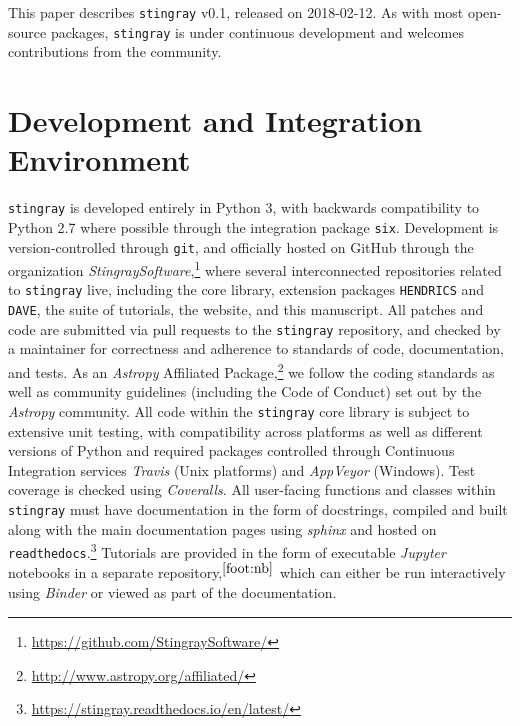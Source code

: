 \documentclass[twocolumn]{aastex62}
\newcommand{\stingray}{\texttt{stingray}\xspace}
\newcommand{\hendrics}{\texttt{HENDRICS}\xspace}
\begin{document}
This paper describes \stingray v0.1, released on 2018-02-12. 
As with most open-source packages, \stingray is under continuous development and welcomes contributions from the community.


\section{Development and Integration Environment}
\label{sec:development}

\stingray is developed entirely in Python 3, with backwards compatibility to Python 2.7 where possible through the integration package \texttt{six}. 
Development is version-controlled through \texttt{git}, and officially hosted on GitHub through the organization \textit{StingraySoftware},\footnote{\url{https://github.com/StingraySoftware/}} where several interconnected repositories related to \stingray live, including the core library, extension packages \hendrics and \texttt{DAVE}, the suite of tutorials, the website, and this manuscript. 
All patches and code are submitted via pull requests to the \stingray repository, and checked by a maintainer for correctness and adherence to standards of code, documentation, and tests. 
As an \textit{Astropy} Affiliated Package,\footnote{\url{http://www.astropy.org/affiliated/}} we follow the coding standards as well as community guidelines (including the Code of Conduct) set out by the \textit{Astropy} community. 
All code within the \stingray core library is subject to extensive unit testing, with compatibility across platforms as well as different versions of Python and required packages controlled through Continuous Integration services \textit{Travis} (Unix platforms) and \textit{AppVeyor} (Windows). 
Test coverage is checked using \textit{Coveralls}. 
All user-facing functions and classes within \stingray must have documentation in the form of docstrings, compiled and built along with the main documentation pages using \textit{sphinx} and hosted on \texttt{readthedocs}.\footnote{\url{https://stingray.readthedocs.io/en/latest/}}
Tutorials are provided in the form of executable \textit{Jupyter} notebooks in a separate repository,$^{\ref{foot:nb}}$ which can either be run interactively using \textit{Binder} \citep{project_jupyter-proc-scipy-2018} or viewed as part of the documentation. 


\end{document}
